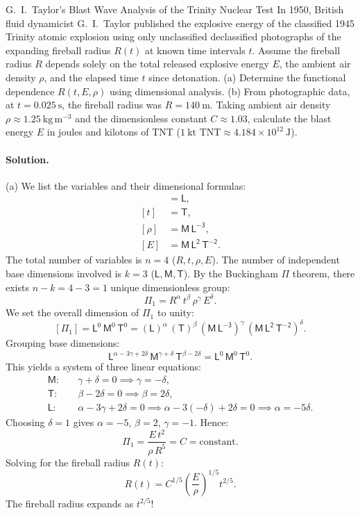 \begin{workedexample}{G.~I.~Taylor's Blast Wave Analysis of the Trinity Nuclear Test}
In 1950, British fluid dynamicist G.~I.~Taylor published the explosive energy of the classified 1945 Trinity atomic explosion using only unclassified declassified photographs of the expanding fireball radius $R(t)$ at known time intervals $t$.
Assume the fireball radius $R$ depends solely on the total released explosive energy $E$, the ambient air density $\rho$, and the elapsed time $t$ since detonation.
(a) Determine the functional dependence $R(t, E, \rho)$ using dimensional analysis.
(b) From photographic data, at $t = 0.025\ \mathrm{s}$, the fireball radius was $R = 140\ \mathrm{m}$. Taking ambient air density $\rho \approx 1.25\ \mathrm{kg\,m^{-3}}$ and the dimensionless constant $C \approx 1.03$, calculate the blast energy $E$ in joules and kilotons of TNT ($1\ \text{kt TNT} \approx 4.184\times 10^{12}\ \mathrm{J}$).

\paragraph{Solution.}

(a) We list the variables and their dimensional formulas:
\begin{align*}
[R] &= \mathsf{L}, \\
[t] &= \mathsf{T}, \\
[\rho] &= \mathsf{M\,L^{-3}}, \\
[E] &= \mathsf{M\,L^2\,T^{-2}}.
\end{align*}
The total number of variables is $n = 4$ ($R, t, \rho, E$). The number of independent base dimensions involved is $k = 3$ ($\mathsf{L}, \mathsf{M}, \mathsf{T}$).
By the Buckingham $\Pi$ theorem, there exists $n - k = 4 - 3 = 1$ unique dimensionless group:
\[
\Pi_1 = R^\alpha\,t^\beta\,\rho^\gamma\,E^\delta.
\]
We set the overall dimension of $\Pi_1$ to unity:
\[
[\Pi_1] = \mathsf{L}^0\,\mathsf{M}^0\,\mathsf{T}^0 = (\mathsf{L})^\alpha\,(\mathsf{T})^\beta\,(\mathsf{M\,L^{-3}})^\gamma\,(\mathsf{M\,L^2\,T^{-2}})^\delta.
\]
Grouping base dimensions:
\[
\mathsf{L}^{\alpha - 3\gamma + 2\delta}\,\mathsf{M}^{\gamma + \delta}\,\mathsf{T}^{\beta - 2\delta} = \mathsf{L}^0\,\mathsf{M}^0\,\mathsf{T}^0.
\]
This yields a system of three linear equations:
\begin{align*}
\mathsf{M}:\quad & \gamma + \delta = 0 \implies \gamma = -\delta, \\
\mathsf{T}:\quad & \beta - 2\delta = 0 \implies \beta = 2\delta, \\
\mathsf{L}:\quad & \alpha - 3\gamma + 2\delta = 0 \implies \alpha - 3(-\delta) + 2\delta = 0 \implies \alpha = -5\delta.
\end{align*}
Choosing $\delta = 1$ gives $\alpha = -5$, $\beta = 2$, $\gamma = -1$. Hence:
\[
\Pi_1 = \frac{E\,t^2}{\rho\,R^5} = C = \text{constant.}
\]
Solving for the fireball radius $R(t)$:
\[
\boxed{R(t) = C^{1/5}\left(\frac{E}{\rho}\right)^{1/5} t^{2/5}.}
\]
The fireball radius expands as $t^{2/5}$!


\end{workedexample}
